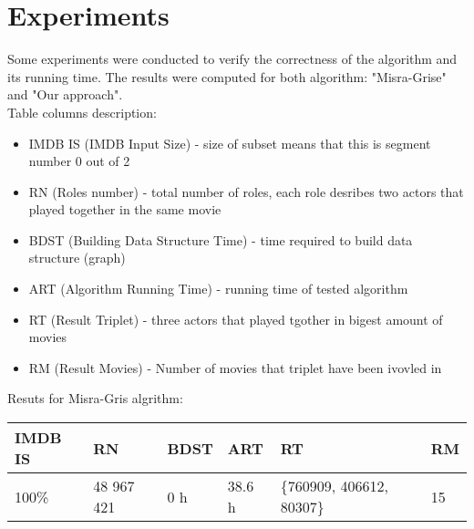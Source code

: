 \label{Experiments}
\section{Experiments}


Some experiments were conducted to verify the correctness of the algorithm and its running time. The results were computed for both algorithm: "Misra-Grise"  and "Our approach".\\

Table columns description:
 
\begin{itemize}
  \item IMDB IS (IMDB Input Size) - size of subset means that this is segment number 0 out of 2
  \item RN (Roles number) - total number of roles, each role desribes two actors that played together in the same movie
  \item BDST (Building Data Structure Time) - time required to build data structure (graph)
  \item ART (Algorithm Running Time) - running time of tested algorithm
  \item RT (Result Triplet) - three actors that played tgother in bigest amount of movies
  \item RM (Result Movies) - Number of movies that triplet have been ivovled in
\end{itemize}

Resuts for Misra-Gris algrithm:

\begin{table}[h]
\begin{tabular}{|p{2.5cm}|l|p{1.9cm}|p{1.5cm}|p{4.3cm}|l|}
\hline
IMDB IS          & RN & BDST  & ART & RT                    & RM  \\ \hline
100\%            &       48 967 421      & 0 h         & 38.6 h       & \{760909, 406612, 80307\}  & 15  \\ \hline
\end{tabular}
\end{table}

